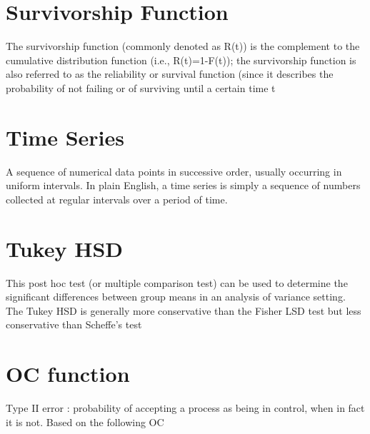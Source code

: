 %
%





\section{Survivorship Function}
The survivorship function (commonly denoted as R(t)) is the complement to the cumulative distribution function
(i.e., R(t)=1-F(t)); the survivorship function is also referred to as the reliability or survival function (since it describes the probability of not failing or of surviving until a certain time t
\section{Time Series}

A sequence of numerical data points in successive order, usually occurring in uniform intervals. In plain English, a time series is simply a sequence of numbers collected at regular intervals over a period of time.





\section{Tukey HSD}

This post hoc test (or multiple comparison test) can be used to determine the significant differences between group means in an analysis of variance setting. The Tukey HSD is generally more conservative than the Fisher LSD test but less conservative than Scheffe's test





\section{OC function}
Type II error : probability of accepting a process as being in control, when in fact it is not.
Based on the following OC



